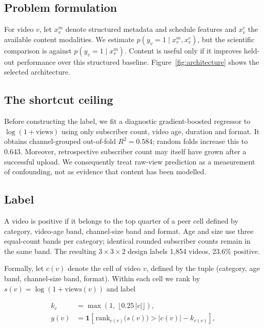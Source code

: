 \documentclass[letterpaper]{article}
\begin{document}
\subsection{Problem formulation}

For video $v$, let $x_v^{m}$ denote structured metadata and schedule features
and $x_v^{c}$ the available content modalities. We estimate
$p(y_v=1\mid x_v^{m},x_v^{c})$, but the scientific comparison is against
$p(y_v=1\mid x_v^{m})$. Content is useful only if it improves held-out
performance over this structured baseline. Figure~\ref{fig:architecture}
shows the selected architecture.

\subsection{The shortcut ceiling}

Before constructing the label, we fit a diagnostic gradient-boosted regressor
to $\log(1+\mathrm{views})$ using only subscriber count, video age, duration and
format. It obtains channel-grouped out-of-fold $R^2=0.584$; random folds increase
this to 0.643. Moreover, retrospective subscriber count may itself have grown
after a successful upload. We consequently treat raw-view prediction as a
measurement of confounding, not as evidence that content has been modelled.

\subsection{Label}

A video is positive if it belongs to the top quarter of a peer cell defined by
category, video-age band, channel-size band and format. Age and size use three
equal-count bands per category; identical rounded subscriber counts remain in
the same band. The resulting $3\times3\times2$ design labels 1{,}854 videos,
23.6\% positive.

Formally, let $c(v)$ denote the cell of video $v$, defined by the tuple
(category, age band, channel-size band, format). Within each cell we rank by
$s(v) = \log(1 + \mathrm{views}(v))$ and label

\begin{equation}
\begin{split}
k_c &= \max\!\left(1,\; \lfloor 0.25\,|c| \rfloor\right), \\[2pt]
y(v) &= \mathbf{1}\!\left[\, \mathrm{rank}_{c(v)}\big(s(v)\big) > |c(v)| - k_{c(v)} \right],
\end{split}
\end{equation}
\end{document}
